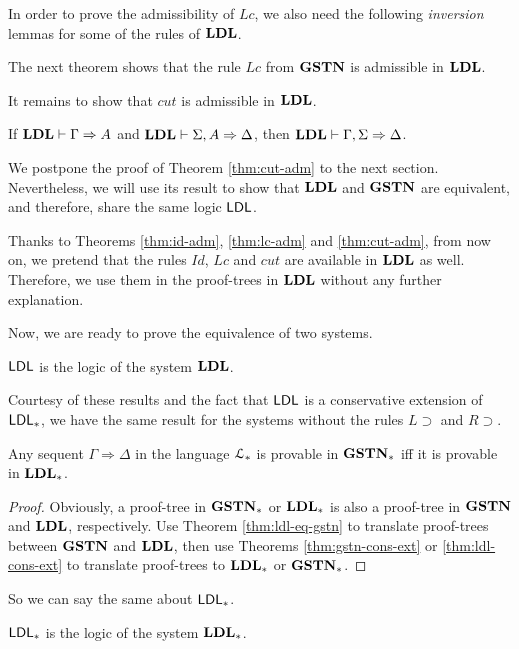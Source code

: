 



In order to prove the admissibility of $Lc$, we also need the following \emph{inversion} lemmas for some of the rules of $\mathbf{LDL}$.


The next theorem shows that the rule $Lc$ from $\mathbf{GSTN}$ is admissible in $\mathbf{LDL}$.


It remains to show that $cut$ is admissible in $\mathbf{LDL}$.

\begin{thm}\label{thm:cut-adm}
  If $\mathbf{LDL} \vdash \Gamma \Rightarrow A$ and $\mathbf{LDL} \vdash \Sigma, A \Rightarrow \Delta$, then $\mathbf{LDL} \vdash \Gamma, \Sigma \Rightarrow \Delta$.
\end{thm}

We postpone the proof of Theorem \ref{thm:cut-adm} to the next section. Nevertheless, we will use its result to show that $\mathbf{LDL}$ and $\mathbf{GSTN}$ are equivalent, and therefore, share the same logic $\mathsf{LDL}$.

\begin{nota}
  Thanks to Theorems \ref{thm:id-adm}, \ref{thm:lc-adm} and \ref{thm:cut-adm}, from now on, we pretend that the rules $Id$, $Lc$ and $cut$ are available in $\mathbf{LDL}$ as well. Therefore, we use them in the proof-trees in $\mathbf{LDL}$ without any further explanation.
\end{nota}

Now, we are ready to prove the equivalence of two systems.



\begin{cor}
  $\mathsf{LDL}$ is the logic of the system $\mathbf{LDL}$.
\end{cor}

Courtesy of these results and the fact that $\mathsf{LDL}$ is a conservative extension of $\mathsf{LDL}_*$, we have the same result for the systems without the rules $L \supset$ and $R \supset$.

\begin{thm}
  Any sequent $\Gamma \Rightarrow \Delta$ in the language $\mathcal{L}_*$ is provable in $\mathbf{GSTN}_*$ iff it is provable in $\mathbf{LDL}_*$.
\end{thm}
\begin{proof}
  Obviously, a proof-tree in $\mathbf{GSTN}_*$ or $\mathbf{LDL}_*$ is also a proof-tree in $\mathbf{GSTN}$ and $\mathbf{LDL}$, respectively. Use Theorem \ref{thm:ldl-eq-gstn} to translate proof-trees between $\mathbf{GSTN}$ and $\mathbf{LDL}$, then use Theorems \ref{thm:gstn-cons-ext} or \ref{thm:ldl-cons-ext} to translate proof-trees to $\mathbf{LDL}_*$ or $\mathbf{GSTN}_*$.
\end{proof}

So we can say the same about $\mathsf{LDL}_*$.

\begin{cor}
  $\mathsf{LDL}_*$ is the logic of the system $\mathbf{LDL}_*$.
\end{cor}
